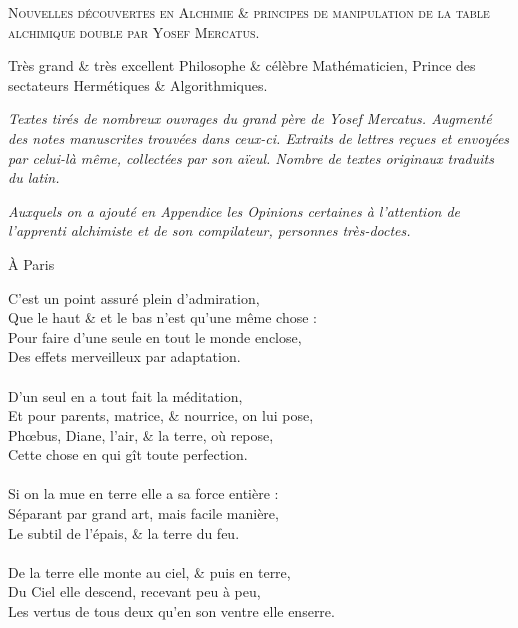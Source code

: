\newpage

\thispagestyle{empty}

\newlength{\savedparindent}
\setlength{\savedparindent}{\parindent}

\setlength{\parindent}{-4em}


\fontsize{25pt}{25pt}\selectfont{}
\textsc{Nouvelles découvertes en Alchimie \& principes de manipulation de la
table alchimique double par Yosef Mercatus.}

\vspace*{1cm}

\fontsize{20pt}{20pt}\selectfont{}
Très grand \& très excellent Philosophe \& célèbre Mathématicien, Prince des
sectateurs Hermétiques \& Algorithmiques.

\vspace*{1cm}

\textit{Textes tirés de nombreux ouvrages du grand père de Yosef Mercatus.
Augmenté des notes manuscrites trouvées dans ceux-ci.  Extraits de lettres
reçues et envoyées par celui-là même, collectées par son aïeul.  Nombre de
textes originaux traduits du latin.  }

\textit{Auxquels on a ajouté en Appendice les Opinions certaines à l'attention
de l'apprenti alchimiste et de son compilateur, personnes très-doctes.}

\setlength{\parindent}{\savedparindent}

\begin{flushright}
À Paris
\end{flushright}

\newpage

\normalsize

\noindent{}C'est un point assuré plein d'admiration,\\
Que le haut \& et le bas n'est qu'une même chose :\\
Pour faire d'une seule en tout le monde enclose,\\
Des effets merveilleux par adaptation.\\
\\
D'un seul en a tout fait la méditation,\\
Et pour parents, matrice, \& nourrice, on lui pose,\\
Phœbus, Diane, l'air, \& la terre, où repose,\\
Cette chose en qui gît toute perfection.\\
\\
Si on la mue en terre elle a sa force entière :\\
Séparant par grand art, mais facile manière,\\
Le subtil de l'épais, \& la terre du feu.\\
\\
De la terre elle monte au ciel, \& puis en terre,\\
Du Ciel elle descend, recevant peu à peu,\\
Les vertus de tous deux qu'en son ventre elle enserre.\\

